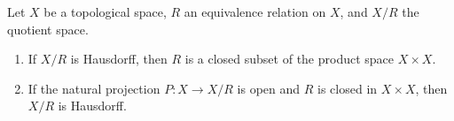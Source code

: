 Let $X$ be a topological space, $R$ an equivalence relation on $X$, and $X/R$ the quotient space.
\begin{enumerate}
  \item If $X/R$ is Hausdorff, then $R$ is a closed subset of the product space $X \times X$.
  \item If the natural projection $P: X \to X/R$ is open and $R$ is closed in $X \times X$, then $X/R$ is Hausdorff.
\end{enumerate}
